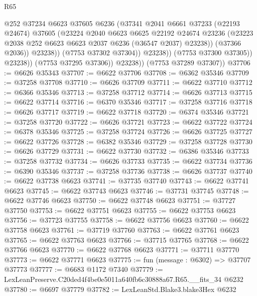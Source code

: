 \begin{lexlean}{R65}
\begin{coremodule}
{                            @252
                            @37234
                            @6623
                            @37605
                            @6236
                            (@37341
                              @2041
                              @6661
                              @37233
                              (@22193 @24674)
                              @37605
                              (@23224
                                @2040
                                @6623
                                @6625
                                @22192
                                @24674
                                @23236
                                (@23223 @2038 @252 @6623 @6623 @2037 @6236 (@36547 @2037) @23238))
                              (@37366 @2036))
                            @23238))
                        (@7753 @37302 @37304))
                      @23238))
                  (@7753 @37300 @37305))
                @23238))
            (@7753 @37295 @37306))
          @23238))
      (@7753 @37289 @37307))
@37706 := @6626 @35343
@37707 := @6622 @37706
@37708 := @6362 @35346
@37709 := @37258 @37708
@37710 := @6626 @37709
@37711 := @6622 @37710
@37712 := @6366 @35346
@37713 := @37258 @37712
@37714 := @6626 @37713
@37715 := @6622 @37714
@37716 := @6370 @35346
@37717 := @37258 @37716
@37718 := @6626 @37717
@37719 := @6622 @37718
@37720 := @6374 @35346
@37721 := @37258 @37720
@37722 := @6626 @37721
@37723 := @6622 @37722
@37724 := @6378 @35346
@37725 := @37258 @37724
@37726 := @6626 @37725
@37727 := @6622 @37726
@37728 := @6382 @35346
@37729 := @37258 @37728
@37730 := @6626 @37729
@37731 := @6622 @37730
@37732 := @6386 @35346
@37733 := @37258 @37732
@37734 := @6626 @37733
@37735 := @6622 @37734
@37736 := @6390 @35346
@37737 := @37258 @37736
@37738 := @6626 @37737
@37740 := @6622 @37738 @6623
@37741 := @37735 @37740
@37743 := @6622 @37741 @6623
@37745 := @6622 @37743 @6623
@37746 := @37731 @37745
@37748 := @6622 @37746 @6623
@37750 := @6622 @37748 @6623
@37751 := @37727 @37750
@37753 := @6622 @37751 @6623
@37755 := @6622 @37753 @6623
@37756 := @37723 @37755
@37758 := @6622 @37756 @6623
@37760 := @6622 @37758 @6623
@37761 := @37719 @37760
@37763 := @6622 @37761 @6623
@37765 := @6622 @37763 @6623
@37766 := @37715 @37765
@37768 := @6622 @37766 @6623
@37770 := @6622 @37768 @6623
@37771 := @37711 @37770
@37773 := @6622 @37771 @6623
@37775 := fun (message : @6302) => @37707 @37773
@37777 := @6683 @1172 @7340
@37779 := LexLeanPreserve.C20ded4f4be0e5011a640fb6c30888a67.R65.__fits_34 @6232
@37780 := @6697 @37779
@37782 := LexLeanStd.Blake3.blake3Hex @6232
}
\end{coremodule}
\end{lexlean}
